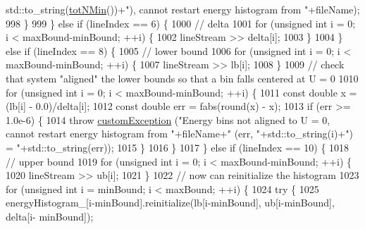 \begin{DoxyCode}
      std::to\_string(\hyperlink{classsim_system_af10842e0eaa638373b8717c87b47e6bc}{totNMin}())+\textcolor{stringliteral}{"), cannot restart energy histogram from "}+fileName);
998             \}
999         \} \textcolor{keywordflow}{else} \textcolor{keywordflow}{if} (lineIndex == 6) \{
1000             \textcolor{comment}{// delta}
1001             \textcolor{keywordflow}{for} (\textcolor{keywordtype}{unsigned} \textcolor{keywordtype}{int} i = 0; i < maxBound-minBound; ++i) \{
1002                 lineStream >> delta[i];
1003             \}
1004         \} \textcolor{keywordflow}{else} \textcolor{keywordflow}{if} (lineIndex == 8) \{
1005             \textcolor{comment}{// lower bound}
1006             \textcolor{keywordflow}{for} (\textcolor{keywordtype}{unsigned} \textcolor{keywordtype}{int} i = 0; i < maxBound-minBound; ++i) \{
1007                 lineStream >> lb[i];
1008             \}
1009             \textcolor{comment}{// check that system "aligned" the lower bounds so that a bin falls centered at U = 0}
1010             \textcolor{keywordflow}{for} (\textcolor{keywordtype}{unsigned} \textcolor{keywordtype}{int} i = 0; i < maxBound-minBound; ++i) \{
1011                 \textcolor{keyword}{const} \textcolor{keywordtype}{double} x = (lb[i] - 0.0)/delta[i];
1012                 \textcolor{keyword}{const} \textcolor{keywordtype}{double} err = fabs(round(x) - x);
1013                 \textcolor{keywordflow}{if} (err >= 1.0e-6) \{
1014                     \textcolor{keywordflow}{throw} \hyperlink{classcustom_exception}{customException} (\textcolor{stringliteral}{"Energy bins not aligned to U = 0, cannot restart
       energy histogram from "}+fileName+\textcolor{stringliteral}{" (err, "}+std::to\_string(i)+\textcolor{stringliteral}{") = "}+std::to\_string(err));
1015                 \}
1016             \}
1017         \} \textcolor{keywordflow}{else} \textcolor{keywordflow}{if} (lineIndex == 10) \{
1018             \textcolor{comment}{// upper bound}
1019             \textcolor{keywordflow}{for} (\textcolor{keywordtype}{unsigned} \textcolor{keywordtype}{int} i = 0; i < maxBound-minBound; ++i) \{
1020                 lineStream >> ub[i];
1021             \}
1022             \textcolor{comment}{// now can reinitialize the histogram}
1023             \textcolor{keywordflow}{for} (\textcolor{keywordtype}{unsigned} \textcolor{keywordtype}{int} i = minBound; i < maxBound; ++i) \{
1024                 \textcolor{keywordflow}{try} \{
1025                     energyHistogram\_[i-minBound].reinitialize(lb[i-minBound], ub[i-minBound], delta[i-
      minBound]);

\end{DoxyCode}
